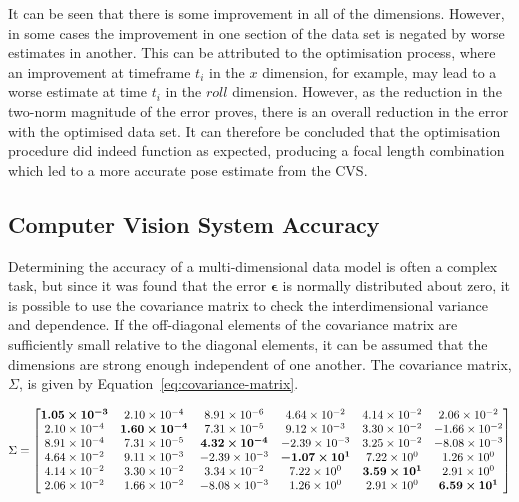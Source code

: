 It can be seen that there is some improvement in all of the dimensions. However, in some cases the improvement in one section of the data set is negated by worse estimates in another. This can be attributed to the optimisation process, where an improvement at timeframe $t_i$ in the $x$ dimension, for example, may lead to a worse estimate at time $t_i$ in the $roll$ dimension. However, as the reduction in the two-norm magnitude of the error proves, there is an overall reduction in the error with the optimised data set. It can therefore be concluded that the optimisation procedure did indeed function as expected, producing a focal length combination which led to a more accurate pose estimate from the CVS. 

\subsection{Computer Vision System Accuracy}

Determining the accuracy of a multi-dimensional data model is often a complex task, but since it was found that the error $\bm{\epsilon}$ is normally distributed about zero, it is possible to use the covariance matrix to check the interdimensional variance and dependence. If the off-diagonal elements of the covariance matrix are sufficiently small relative to the diagonal elements, it can be assumed that the dimensions are strong enough independent of one another. The covariance matrix, $\Sigma$, is given by Equation~\ref{eq:covariance-matrix}. 

\setlength{\arraycolsep}{2pt}
\footnotesize
\begin{equation}
  \label{eq:covariance-matrix}
  \Sigma = 
  \begin{bmatrix}
    \bm{1.05\times 10^{-3}}  &  2.10\times 10^{-4}       &  8.91\times 10^{-6}       &  4.64\times 10^{-2}       &  4.14\times 10^{-2}      &  2.06\times 10^{-2}       \\
    2.10\times 10^{-4}       &  \bm{1.60\times 10^{-4}}  &  7.31\times 10^{-5}       &  9.12\times 10^{-3}       &  3.30\times 10^{-2}      & -1.66\times 10^{-2}       \\
    8.91\times 10^{-4}       &  7.31\times 10^{-5}       &  \bm{4.32\times 10^{-4}}  & -2.39\times 10^{-3}       &  3.25\times 10^{-2}      & -8.08\times 10^{-3}       \\
    4.64\times 10^{-2}       &  9.11\times 10^{-3}       & -2.39\times 10^{-3}       &  \bm{-1.07\times 10^{1}}  &  7.22\times 10^{0}       &  1.26\times 10^{0}        \\
    4.14\times 10^{-2}       &  3.30\times 10^{-2}       &  3.34\times 10^{-2}       &  7.22\times 10^{0}        &  \bm{3.59\times 10^{1}}  &  2.91\times 10^{0}        \\
    2.06\times 10^{-2}       &  1.66\times 10^{-2}       & -8.08\times 10^{-3}       &  1.26\times 10^{0}        &  2.91\times 10^{0}       &  \bm{6.59\times 10^{1}}   \\
  \end{bmatrix}
  \end{equation}
\normalsize

